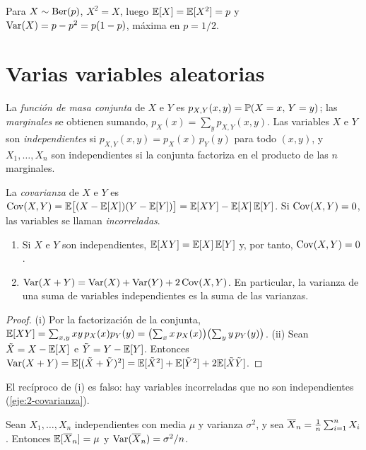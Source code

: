 Para $X\sim\operatorname{Ber}(p)$, $X^{2}=X$, luego $\mathbb{E}[X]=\mathbb{E}[X^{2}]=p$ y $\operatorname{Var}(X)=p-p^{2}=p(1-p)$, máxima en $p=1/2$.

\section{Varias variables aleatorias}

\begin{definicion}\label{def:conjunta}
La \emph{función de masa conjunta} de $X$ e $Y$ es $p_{X,Y}(x,y)=\mathbb{P}(X=x,\,Y=y)$; las \emph{marginales} se obtienen sumando, $p_X(x)=\sum_y p_{X,Y}(x,y)$. Las variables $X$ e $Y$ son \emph{independientes} si $p_{X,Y}(x,y)=p_X(x)\,p_Y(y)$ para todo $(x,y)$, y $X_1,\dots,X_n$ son independientes si la conjunta factoriza en el producto de las $n$ marginales.
\end{definicion}

\begin{definicion}[Covarianza]
La \emph{covarianza} de $X$ e $Y$ es $\operatorname{Cov}(X,Y)=\mathbb{E}\bigl[(X-\mathbb{E}[X])(Y-\mathbb{E}[Y])\bigr]=\mathbb{E}[XY]-\mathbb{E}[X]\,\mathbb{E}[Y]$. Si $\operatorname{Cov}(X,Y)=0$, las variables se llaman \emph{incorreladas}.
\end{definicion}

\begin{proposicion}\label{prop:suma}
\begin{enumerate}
  \item Si $X$ e $Y$ son independientes, $\mathbb{E}[XY]=\mathbb{E}[X]\,\mathbb{E}[Y]$ y, por tanto, $\operatorname{Cov}(X,Y)=0$.
  \item $\operatorname{Var}(X+Y)=\operatorname{Var}(X)+\operatorname{Var}(Y)+2\operatorname{Cov}(X,Y)$. En particular, la varianza de una suma de variables independientes es la suma de las varianzas.
\end{enumerate}
\end{proposicion}

\begin{proof}
(i) Por la factorización de la conjunta, $\mathbb{E}[XY]=\sum_{x,y}xy\,p_X(x)p_Y(y)=\bigl(\sum_x x\,p_X(x)\bigr)\bigl(\sum_y y\,p_Y(y)\bigr)$. (ii) Sean $\tilde X=X-\mathbb{E}[X]$ e $\tilde Y=Y-\mathbb{E}[Y]$. Entonces $\operatorname{Var}(X+Y)=\mathbb{E}[(\tilde X+\tilde Y)^{2}]=\mathbb{E}[\tilde X^{2}]+\mathbb{E}[\tilde Y^{2}]+2\mathbb{E}[\tilde X\tilde Y]$.
\end{proof}

El recíproco de (i) es falso: hay variables incorreladas que no son independientes (\cref{eje:2-covarianza}).

\begin{corolario}\label{cor:media}
Sean $X_1,\dots,X_n$ independientes con media $\mu$ y varianza $\sigma^{2}$, y sea $\overline{X}_n=\frac1n\sum_{i=1}^{n}X_i$. Entonces $\mathbb{E}[\overline{X}_n]=\mu$ y $\operatorname{Var}(\overline{X}_n)=\sigma^{2}/n$.
\end{corolario}

